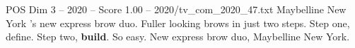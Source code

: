 \begin{textsample}{POS Dim 3 – 2020 – Score 1.00 – 2020/tv\_com\_2020\_47.txt}  \label{ex:f3_pos_070}
Maybelline New York 's new express brow duo.
Fuller looking brows in just two steps.
Step one, define.
Step two, \textbf{build}.
So easy.
New express brow duo, Maybelline New York.

\end{textsample}
